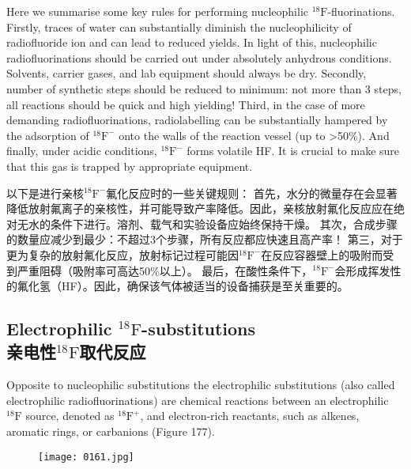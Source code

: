 \documentclass[dvipsnames, svgnames,a4paper,11pt]{article}
\begin{document}
Here we summarise some key rules for performing nucleophilic ${}^\mathrm{18}\mathrm{F}$-fluorinations.
Firstly, traces of water can substantially diminish the nucleophilicity of radiofluoride
ion and can lead to reduced yields. In light of this, nucleophilic radiofluorinations
should be carried out under absolutely anhydrous conditions. Solvents, carrier gases,
and lab equipment should always be dry. Secondly, number of synthetic steps
should be reduced to minimum: not more than 3 steps, all reactions should be quick
and high yielding! Third, in the case of more demanding radiofluorinations,
radiolabelling can be substantially hampered by the adsorption of ${}^\mathrm{18}\mathrm{F}^−$ onto the walls
of the reaction vessel (up to >50\%). And finally, under acidic conditions, ${}^\mathrm{18}\mathrm{F}^−$ forms
volatile HF. It is crucial to make sure that this gas is trapped by appropriate
equipment.

以下是进行亲核${}^\mathrm{18}\mathrm{F}^−$氟化反应时的一些关键规则： 首先，水分的微量存在会显著降低放射氟离子的亲核性，并可能导致产率降低。因此，亲核放射氟化反应应在绝对无水的条件下进行。溶剂、载气和实验设备应始终保持干燥。 其次，合成步骤的数量应减少到最少：不超过3个步骤，所有反应都应快速且高产率！ 第三，对于更为复杂的放射氟化反应，放射标记过程可能因${}^\mathrm{18}\mathrm{F}^−$在反应容器壁上的吸附而受到严重阻碍（吸附率可高达50\%以上）。 最后，在酸性条件下，${}^\mathrm{18}\mathrm{F}^−$会形成挥发性的氟化氢（HF）。因此，确保该气体被适当的设备捕获是至关重要的。

\subsection{Electrophilic ${}^\mathrm{18}\mathrm{F}$-substitutions \\亲电性${}^\mathrm{18}\mathrm{F}$取代反应}

Opposite to nucleophilic substitutions the electrophilic substitutions (also called
electrophilic radiofluorinations) are chemical reactions between an electrophilic ${}^\mathrm{18}\mathrm{F}$
source, denoted as {${}^\mathrm{18}\mathrm{F}^+$}, and electron-rich reactants, such as alkenes, aromatic
rings, or carbanions (Figure 177).

\begin{figure}[h]
	\centering
    \texttt{[image: 0161.jpg]}    
     \label{fig177}
\end{figure}
\end{document}
